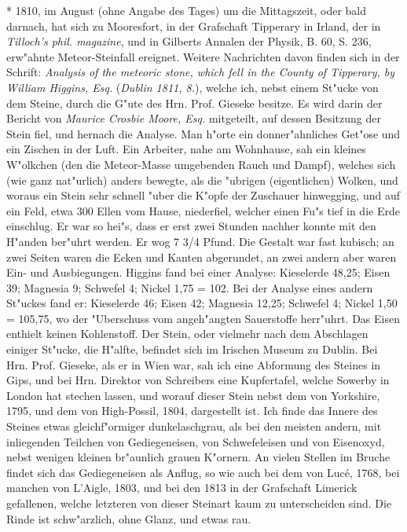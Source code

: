 \documentclass[a4paper, 11pt, oneside, polutonikogreek, german]{article}
\begin{document}
* 1810, im August (ohne Angabe des Tages) um die Mittagszeit, oder bald darnach, hat sich zu Mooresfort, in der Grafschaft Tipperary in Irland, der in \emph{Tilloch's phil. magazine}, und in Gilberts Annalen der Physik, B. 60, S. 236, erw"ahnte Meteor-Steinfall ereignet. Weitere Nachrichten davon finden sich in der Schrift: \emph{Analysis of the meteoric stone, which fell in the County of Tipperary, by William Higgins, Esq.} (\emph{Dublin 1811, 8.}), welche ich, nebst einem St"ucke von dem Steine, durch die G"ute des Hrn. Prof. Gieseke besitze. Es wird darin der Bericht von \emph{Maurice Crosbie Moore, Esq.} mitgeteilt, auf dessen Besitzung der Stein fiel, und hernach die Analyse. Man h"orte ein donner"ahnliches Get"ose und ein Zischen in der Luft. Ein Arbeiter, nahe am Wohnhause, sah ein kleines W"olkchen (den die Meteor-Masse umgebenden Rauch und Dampf), welches sich (wie ganz nat"urlich) anders bewegte, als die "ubrigen (eigentlichen) Wolken, und woraus ein Stein sehr schnell "uber die K"opfe der Zuschauer hinwegging, und auf ein Feld, etwa 300 Ellen vom Hause, niederfiel, welcher einen Fu"s tief in die Erde einschlug. Er war so hei"s, dass er erst zwei Stunden nachher konnte mit den H"anden ber"uhrt werden. Er wog 7 3/4 Pfund. Die Gestalt war fast kubisch; an zwei Seiten waren die Ecken und Kanten abgerundet, an zwei andern aber waren Ein- und Ausbiegungen. Higgins fand bei einer Analyse: Kieselerde 48,25; Eisen 39; Magnesia 9; Schwefel 4; Nickel 1,75 = 102. Bei der Analyse eines andern St"uckes fand er: Kieselerde 46; Eisen 42; Magnesia 12,25; Schwefel 4; Nickel 1,50 = 105,75, wo der "Uberschuss vom angeh"angten Sauerstoffe herr"uhrt. Das Eisen enthielt keinen Kohlenstoff. Der Stein, oder vielmehr nach dem Abschlagen einiger St"ucke, die H"alfte, befindet sich im Irischen Museum zu Dublin. Bei Hrn. Prof. Gieseke, als er in Wien war, sah ich eine Abformung des Steines in Gips, und bei Hrn. Direktor von Schreibers eine Kupfertafel, welche Sowerby in London hat stechen lassen, und worauf dieser Stein nebst dem von Yorkshire, 1795, und dem von High-Possil, 1804, dargestellt ist. Ich finde das Innere des Steines etwas gleichf"ormiger dunkelaschgrau, als bei den meisten andern, mit inliegenden Teilchen von Gediegeneisen, von Schwefeleisen und von Eisenoxyd, nebst wenigen kleinen br"aunlich grauen K"ornern. An vielen Stellen im Bruche findet sich das Gediegeneisen als Anflug, so wie auch bei dem von Lucé, 1768, bei manchen von L'Aigle, 1803, und bei den 1813 in der Grafschaft Limerick gefallenen, welche letzteren von dieser Steinart kaum zu unterscheiden sind. Die Rinde ist schw"arzlich, ohne Glanz, und etwas rau.
\end{document}
